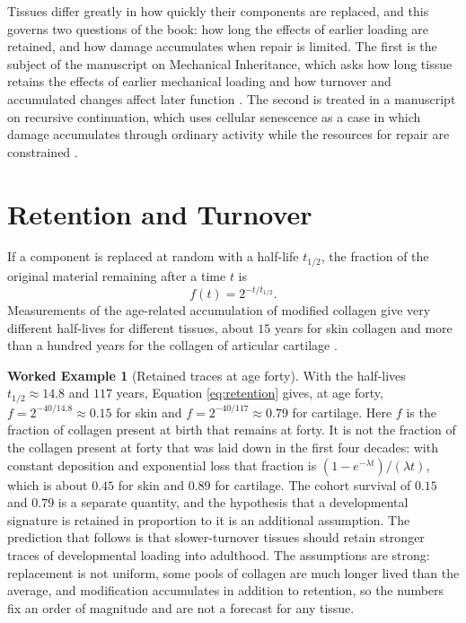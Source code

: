 \documentclass[11pt,openany]{book}
\theoremstyle{definition}
\newtheorem{example}{Worked Example}[chapter]
\theoremstyle{remark}
\begin{document}
Tissues differ greatly in how quickly their components are replaced, and this governs two questions of the book: how long the effects of earlier loading are retained, and how damage accumulates when repair is limited. The first is the subject of the manuscript on Mechanical Inheritance, which asks how long tissue retains the effects of earlier mechanical loading and how turnover and accumulated changes affect later function \cite{flyxion2026mi}. The second is treated in a manuscript on recursive continuation, which uses cellular senescence as a case in which damage accumulates through ordinary activity while the resources for repair are constrained \cite{flyxion2026recursive}.

\section{Retention and Turnover}

If a component is replaced at random with a half-life $t_{1/2}$, the fraction of the original material remaining after a time $t$ is
\begin{equation}
f(t)=2^{-t/t_{1/2}}.
\label{eq:retention}
\end{equation}
Measurements of the age-related accumulation of modified collagen give very different half-lives for different tissues, about $15$ years for skin collagen and more than a hundred years for the collagen of articular cartilage \cite{verzijl2000}.

\begin{example}[Retained traces at age forty]
\label{ex:retained}
With the half-lives $t_{1/2}\approx14.8$ and $117$ years, Equation \eqref{eq:retention} gives, at age forty, $f=2^{-40/14.8}\approx0.15$ for skin and $f=2^{-40/117}\approx0.79$ for cartilage. Here $f$ is the fraction of collagen present at birth that remains at forty. It is not the fraction of the collagen present at forty that was laid down in the first four decades: with constant deposition and exponential loss that fraction is $(1-e^{-\lambda t})/(\lambda t)$, which is about $0.45$ for skin and $0.89$ for cartilage. The cohort survival of $0.15$ and $0.79$ is a separate quantity, and the hypothesis that a developmental signature is retained in proportion to it is an additional assumption. The prediction that follows is that slower-turnover tissues should retain stronger traces of developmental loading into adulthood. The assumptions are strong: replacement is not uniform, some pools of collagen are much longer lived than the average, and modification accumulates in addition to retention, so the numbers fix an order of magnitude and are not a forecast for any tissue.
\end{example}
\end{document}
